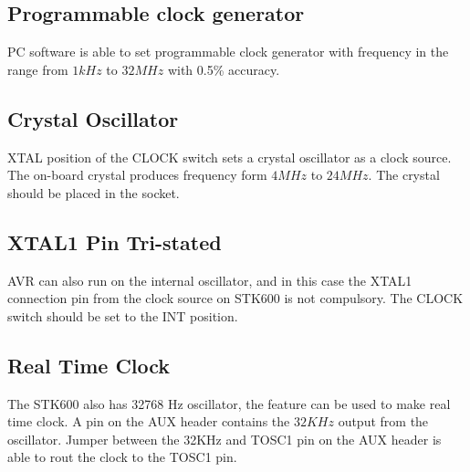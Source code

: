 \documentclass[english]{article}
\begin{document}
\subsection{Programmable clock generator}
PC software is able to set programmable clock generator with frequency in the range from $1kHz$ to $32MHz$ with 0.5\% accuracy.
\subsection{Crystal Oscillator}
XTAL position of the CLOCK switch sets a crystal oscillator as a clock source. The on-board crystal produces frequency form $4MHz$ to $24MHz$. The crystal should be placed in the socket.
\subsection{XTAL1 Pin Tri-stated}
AVR can also run on the internal oscillator, and in this case the XTAL1 connection  pin from the clock source on STK600 is not compulsory. The CLOCK switch should be set to the INT position.
\subsection{Real Time Clock} 
The STK600 also has 32768 Hz oscillator, the feature can be used to make real time clock. A pin on the AUX header contains the $32KHz$ output from the oscillator. Jumper between the 32KHz and TOSC1 pin on the AUX header is able to rout the clock to the TOSC1 pin.
\end{document}
